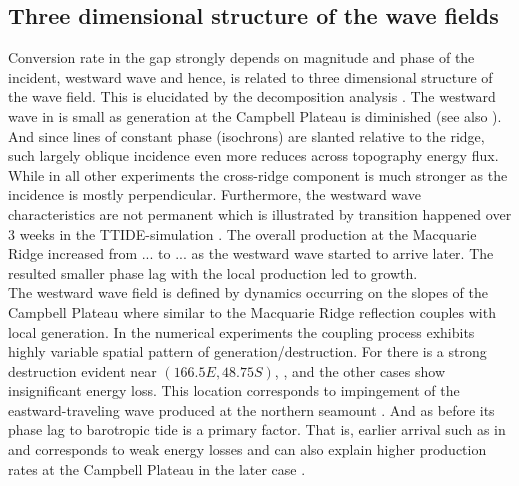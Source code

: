 \documentclass[12pt]{article}
\begin{document}
\subsection{Three dimensional structure of the wave fields}
Conversion rate in the gap strongly depends on magnitude and phase of the incident, westward wave 
and 
hence, is related to three dimensional structure of the wave field. This is elucidated by  
the decomposition analysis . The westward wave in  is small as 
generation at the Campbell Plateau is diminished (see also 
). And since lines of constant phase (isochrons) are slanted relative to the 
ridge, such 
largely oblique incidence even more reduces across topography energy flux. While in all other 
experiments the cross-ridge component is much stronger as the incidence is mostly perpendicular. 
Furthermore, the westward wave characteristics are not permanent which is illustrated 
by 
transition happened over 3 weeks in the TTIDE-simulation . The 
overall 
production at the Macquarie Ridge increased from ... to ...  as the westward 
wave started to arrive later. The resulted smaller phase lag with the local production led to 
growth.\\

The westward wave field is defined by dynamics occurring on the slopes of the Campbell 
Plateau where similar to the Macquarie Ridge reflection couples with local generation. In the 
numerical experiments the coupling process exhibits highly variable spatial pattern of 
generation/destruction. For  there is a strong destruction evident near $(166.5E, 
48.75S)$, , and the other cases show insignificant energy loss. This 
location corresponds to impingement of the eastward-traveling wave produced at the northern 
seamount . And as before its phase lag to barotropic tide 
is a primary factor. That is, earlier arrival such as in  and  corresponds 
to weak energy losses and can also explain higher production rates at the Campbell Plateau in the 
later case .\\
\end{document}
